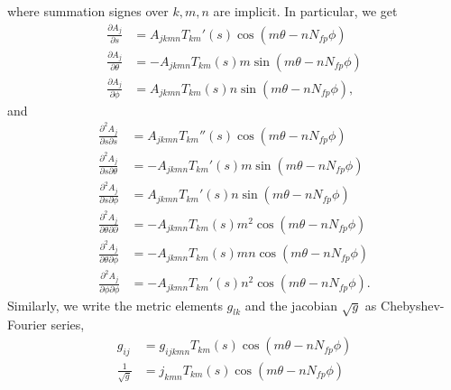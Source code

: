 where summation signes over $k,m,n$ are implicit. In particular, we get
\begin{align}
	\frac{\partial A_j}{\partial s} &= A_{jkmn} T_{km}'(s)\cos(m\theta-nN_{fp}\phi)\\
	\frac{\partial A_j}{\partial \theta} &= -A_{jkmn} T_{km}(s) m\sin(m\theta-nN_{fp}\phi)\\
	\frac{\partial A_j}{\partial \phi} &= A_{jkmn} T_{km}(s)n\sin(m\theta-nN_{fp}\phi),
\end{align}
and
\begin{align}
	\frac{\partial^2 A_j}{\partial s\partial s} &= A_{jkmn} T_{km}''(s)\cos(m\theta-nN_{fp}\phi)\\
	\frac{\partial^2 A_j}{\partial s\partial \theta} &= -A_{jkmn} T_{km}'(s) m\sin(m\theta-nN_{fp}\phi)\\
	\frac{\partial^2 A_j}{\partial s\partial \phi} &= A_{jkmn} T_{km}'(s)n\sin(m\theta-nN_{fp}\phi)\\
	\frac{\partial^2 A_j}{\partial \theta\partial \partial} &= -A_{jkmn} T_{km}(s)m^2\cos(m\theta-nN_{fp}\phi)\\
	\frac{\partial^2 A_j}{\partial \theta\partial \phi} &= -A_{jkmn} T_{km}(s)mn\cos(m\theta-nN_{fp}\phi)\\
	\frac{\partial^2 A_j}{\partial \phi\partial \phi} &= -A_{jkmn} T_{km}'(s)n^2\cos(m\theta-nN_{fp}\phi).
\end{align}
Similarly, we write the metric elements $g_{lk}$ and the jacobian $\sqrt{g}$ as Chebyshev-Fourier series,
\begin{align}
	g_{ij} &= g_{ijkmn}T_{km}(s)\cos(m\theta-nN_{fp}\phi) \\
	\frac{1}{\sqrt{g}} &= j_{kmn}T_{km}(s)\cos(m\theta-nN_{fp}\phi)
\end{align}



